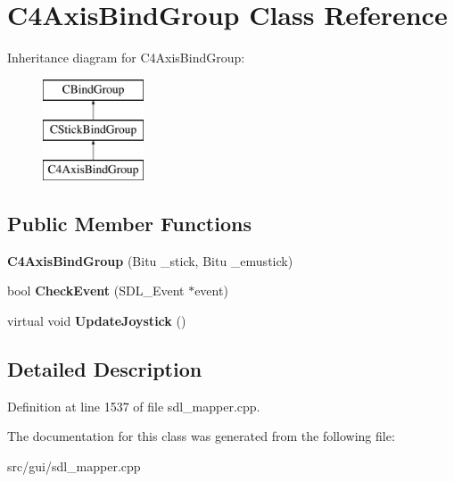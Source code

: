 \hypertarget{classC4AxisBindGroup}{\section{C4\-Axis\-Bind\-Group Class Reference}
\label{classC4AxisBindGroup}
}
Inheritance diagram for C4\-Axis\-Bind\-Group\-:\begin{figure}[H]
\begin{center}
\leavevmode
\includegraphics[height=3.000000cm]{classC4AxisBindGroup}
\end{center}
\end{figure}
\subsection*{Public Member Functions}
\begin{DoxyCompactItemize}
\item 
\hypertarget{classC4AxisBindGroup_a18f535cb78f267a882176039fa912394}{{\bfseries C4\-Axis\-Bind\-Group} (Bitu \-\_\-stick, Bitu \-\_\-emustick)}\label{classC4AxisBindGroup_a18f535cb78f267a882176039fa912394}

\item 
\hypertarget{classC4AxisBindGroup_a895bb30dd9adc0b2a704e30d954b7f5e}{bool {\bfseries Check\-Event} (S\-D\-L\-\_\-\-Event $\ast$event)}\label{classC4AxisBindGroup_a895bb30dd9adc0b2a704e30d954b7f5e}

\item 
\hypertarget{classC4AxisBindGroup_a2de71ed1c0b11f15403f1a63ea7f9169}{virtual void {\bfseries Update\-Joystick} ()}\label{classC4AxisBindGroup_a2de71ed1c0b11f15403f1a63ea7f9169}

\end{DoxyCompactItemize}


\subsection{Detailed Description}


Definition at line 1537 of file sdl\-\_\-mapper.\-cpp.



The documentation for this class was generated from the following file\-:\begin{DoxyCompactItemize}
\item 
src/gui/sdl\-\_\-mapper.\-cpp\end{DoxyCompactItemize}
